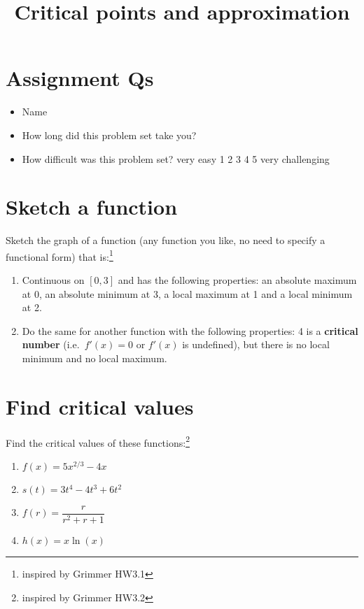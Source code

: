 \documentclass[
]{article}
\title{Critical points and approximation}
\author{}
\date{\vspace{-2.5em}}
\providecommand{\tightlist}{%
  \setlength{\itemsep}{0pt}\setlength{\parskip}{0pt}}
\begin{document}
\maketitle

\section{Assignment Qs}\label{assignment-qs}

\begin{itemize}
\item
  Name
\item
  How long did this problem set take you?
\item
  How difficult was this problem set? very easy 1 2 3 4 5 very
  challenging
\end{itemize}

\section{Sketch a function}\label{sketch-a-function}

Sketch the graph of a function (any function you like, no need to
specify a functional form) that is:\footnote{inspired by Grimmer HW3.1}

\begin{enumerate}
\def\labelenumi{\alph{enumi}.}
\tightlist
\item
  Continuous on \([0,3]\) and has the following properties: an absolute
  maximum at 0, an absolute minimum at 3, a local maximum at 1 and a
  local minimum at 2.
\item
  Do the same for another function with the following properties: 4 is a
  \textbf{critical number} (i.e.~\(f'(x) = 0\) or \(f'(x)\) is
  undefined), but there is no local minimum and no local maximum.
\end{enumerate}

\section{Find critical values}\label{find-critical-values}

Find the critical values of these functions:\footnote{inspired by
  Grimmer HW3.2}

\begin{enumerate}
\def\labelenumi{\alph{enumi}.}
\item
  \(f(x) = 5x^{2/3} - 4x\)
\item
  \(s(t) = 3t^4 - 4t^3 + 6t^2\)
\item
  \(f(r) = \dfrac{r}{r^2 +r + 1}\)
\item
  \(h(x) = x \ln(x)\)
\end{enumerate}
\end{document}
